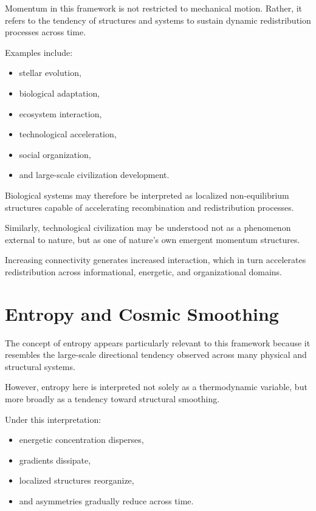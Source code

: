 \documentclass[11pt]{article}
\begin{document}
Momentum in this framework is not restricted to mechanical motion. Rather, it refers to the tendency of structures and systems to sustain dynamic redistribution processes across time.

Examples include:

\begin{itemize}
    \item stellar evolution,
    \item biological adaptation,
    \item ecosystem interaction,
    \item technological acceleration,
    \item social organization,
    \item and large-scale civilization development.
\end{itemize}

Biological systems may therefore be interpreted as localized non-equilibrium structures capable of accelerating recombination and redistribution processes.

Similarly, technological civilization may be understood not as a phenomenon external to nature, but as one of nature's own emergent momentum structures.

Increasing connectivity generates increased interaction, which in turn accelerates redistribution across informational, energetic, and organizational domains.

\section{Entropy and Cosmic Smoothing}

The concept of entropy appears particularly relevant to this framework because it resembles the large-scale directional tendency observed across many physical and structural systems.

However, entropy here is interpreted not solely as a thermodynamic variable, but more broadly as a tendency toward structural smoothing.

Under this interpretation:

\begin{itemize}
    \item energetic concentration disperses,
    \item gradients dissipate,
    \item localized structures reorganize,
    \item and asymmetries gradually reduce across time.
\end{itemize}
\end{document}
